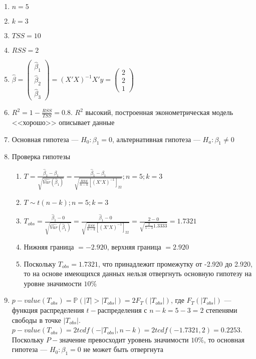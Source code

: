 \documentclass[pdftex,11pt,openany]{book}\usepackage[]{graphicx}\usepackage[]{color}
\begin{document}
\begin{solution}
\begin{enumerate}
\item $n = 5$
\item $k = 3$
\item $TSS = 10$
\item $RSS = 2$
\item $\hat{\beta} = \begin{pmatrix} \hat{\beta}_1 \\ \hat{\beta}_2 \\ \hat{\beta}_3 \end{pmatrix} = (X'X)^{-1}X'y = \begin{pmatrix} 2 \\ 2 \\ 1 \end{pmatrix}$
\item $R^2 = 1 - \frac {RSS}{TSS} = 0.8.$ $R^2$ высокий, построенная эконометрическая модель <<хорошо>> описывает данные
\item Основная гипотеза --- $H_0: \beta_1 = 0$, альтернативная гипотеза --- $H_a: \beta_1 \not= 0$
\item Проверка гипотезы
\begin{enumerate}
\item $T = \frac{\hat{\beta}_1 - \beta_1}{\sqrt{\widehat{Var}(\hat{\beta}_1)}} = \frac {\hat{\beta}_1 - \beta_1}{\sqrt{{\frac{RSS}{n-k}}[(X'X)^{-1}]_{22}}}; n = 5; k = 3$
\item $T \sim t(n-k); n = 5; k = 3$
\item $T_{obs} = \frac{\hat{\beta}_1 - 0}{\sqrt{\widehat{Var}(\hat{\beta}_1)}} = \frac {\hat{\beta}_1 - 0}{\sqrt{{\frac{RSS}{n-k}}[(X'X)^{-1}]_{22}}} = \frac{2-0}{\sqrt{{\frac{2}{5-3}}1.3333}} = 1.7321$
\item Нижняя граница $= -2.920$, верхняя граница $= 2.920$
\item Поскольку $T_{obs} = 1.7321$, что принадлежит промежутку от -2.920 до 2.920, то на основе имеющихся данных нельзя отвергнуть основную гипотезу на уровне значимости $10\%$
\end{enumerate}
\item $p-value(T_{obs}) = \mathbb{P}(|T|>|T_{obs}|) = 2F_{T}(|T_{obs}|)$, где $F_{T}(|T_{obs}|)$ --- функция распределения $t-$распределения с $n - k = 5 - 3 = 2$ степенями свободы в точке $|T_{obs}|$. $p-value(T_{obs}) = 2tcdf(-|T_{obs}|, n - k) = 2tcdf(-1.7321,2) = 0.2253$. Поскольку $P-$значение превосходит уровень значимости $10\%$, то основная гипотеза --- $H_0: \beta_1 = 0$ не может быть отвергнута

\end{enumerate}
\end{solution}
\end{document}
